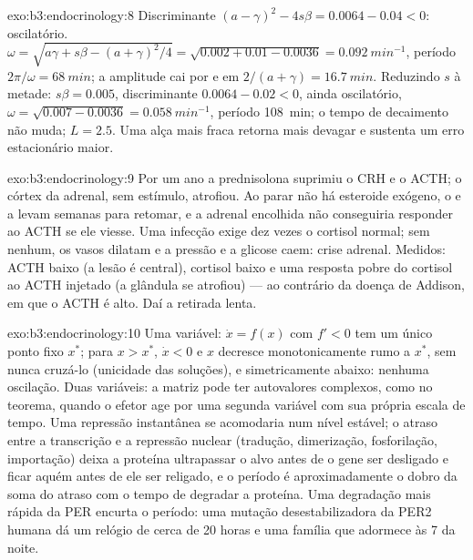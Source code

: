 \begin{solution}{exo:b3:endocrinology:8}
Discriminante $(a - \gamma)^{2} - 4s\beta = 0.0064 - 0.04 < 0$:
oscilatório. $\omega = \sqrt{a\gamma + s\beta - (a+\gamma)^{2}/4} =
\sqrt{0.002 + 0.01 - 0.0036} = \qty{0.092}{min^{-1}}$, período $2\pi/
\omega = \qty{68}{min}$; a amplitude cai por $\mathrm{e}$ em $2/(a +
\gamma) = \qty{16.7}{min}$. Reduzindo $s$ à metade: $s\beta = 0.005$,
discriminante $0.0064 - 0.02 < 0$, ainda oscilatório, $\omega = \sqrt{0.007 - 0.0036}
= \qty{0.058}{min^{-1}}$, período \qty{108}{min};
o tempo de decaimento não muda; $L = 2.5$. Uma alça mais fraca retorna
mais devagar e sustenta um erro estacionário maior.
\end{solution}

\begin{solution}{exo:b3:endocrinology:9}
Por um ano a prednisolona suprimiu o CRH e o ACTH; o córtex da adrenal,
sem estímulo, atrofiou. Ao parar não há esteroide exógeno, o 
e a  levam semanas para retomar, e a adrenal encolhida não
conseguiria responder ao ACTH se ele viesse. Uma infecção exige dez
vezes o cortisol normal; sem nenhum, os vasos dilatam e a pressão e a
glicose caem: crise adrenal. Medidos: ACTH baixo (a lesão é central),
cortisol baixo e uma resposta pobre do cortisol ao ACTH injetado (a
glândula se atrofiou) --- ao contrário da doença de Addison, em que o
ACTH é alto. Daí a retirada lenta.
\end{solution}

\begin{solution}{exo:b3:endocrinology:10}
Uma variável: $\dot x = f(x)$ com $f' < 0$ tem um único ponto fixo
$x^{*}$; para $x > x^{*}$, $\dot x < 0$ e $x$ decresce monotonicamente
rumo a $x^{*}$, sem nunca cruzá-lo (unicidade das soluções), e
simetricamente abaixo: nenhuma oscilação. Duas variáveis: a matriz pode
ter autovalores complexos, como no teorema, quando o efetor age por uma
segunda variável com sua própria escala de tempo. Uma repressão
instantânea se acomodaria num nível estável; o atraso entre a
transcrição e a repressão nuclear (tradução, dimerização, fosforilação,
importação) deixa a proteína ultrapassar o alvo antes de o gene ser
desligado e ficar aquém antes de ele ser religado, e o período é
aproximadamente o dobro da soma do atraso com o tempo de degradar a
proteína. Uma degradação mais rápida da PER encurta o período: uma
mutação desestabilizadora da PER2 humana dá um relógio de cerca de 20
horas e uma família que adormece às 7 da noite.
\end{solution}

